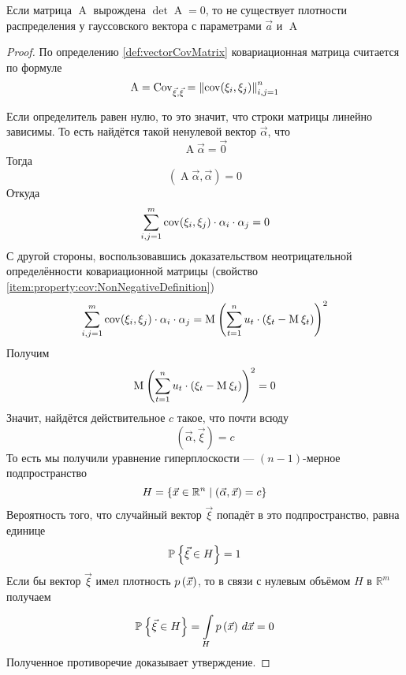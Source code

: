 \begin{affirmation}
  Если матрица $\operatorname{A}$ вырождена $\det\operatorname{A} = 0$, то не
  существует плотности распределения у гауссовского вектора с параметрами
  $\vec{a}$ и $\operatorname{A}$
\end{affirmation}
\begin{proof}
  По определению \ref{def:vectorCovMatrix} ковариационная матрица считается по
  формуле
  $$\operatorname{A}
      = \dCov{\vec{\xi}}
      = \left\| \cov{\xi_i, \xi_j} \right\|_{i,j=1}^n$$

  Если определитель равен нулю, то это значит, что строки матрицы линейно
  зависимы.
  То есть найдётся такой ненулевой вектор $\vec{\alpha}$, что
  \begin{equation*}
    \operatorname{A} \vec{\alpha} = \vec{0}
  \end{equation*}
  Тогда
  \begin{equation*}
    \left( \operatorname{A} \vec{\alpha}, \vec{\alpha} \right) = 0
  \end{equation*}
  Откуда
  \begin{equation*}
    \sum_{i,j=1}^{m} \cov{\xi_i, \xi_j} \cdot \alpha_i \cdot \alpha_j = 0
  \end{equation*}
  С другой стороны, воспользовавшись доказательством  неотрицательной
  определённости ковариационной матрицы
  (свойство \ref{item:property:cov:NonNegativeDefinition})
  \begin{equation*}
    \sum_{i,j=1}^{m} \cov{\xi_i, \xi_j} \cdot \alpha_i \cdot \alpha_j
    = \mean{\left( \sum_{t=1}^{n} u_t
      \cdot \left( \xi_t - \mean{\xi_t} \right) \right)^2}
  \end{equation*}
  Получим
  \begin{equation*}
    \mean{\left( \sum_{t=1}^{n} u_t
      \cdot \left( \xi_t - \mean{\xi_t} \right) \right)^2}
    = 0
  \end{equation*}
  Значит, найдётся действительное $c$ такое, что почти всюду
  \begin{equation*}
    \left( \vec{\alpha}, \vec{\xi} \right) = c
  \end{equation*}
  То есть мы получили уравнение гиперплоскости ---
  $\left( n-1 \right)$-мерное подпространство
  $$H = \left\{ \vec{x} \in \mathbb{R}^n
      \mcond \left( \vec{\alpha}, \vec{x} \right) = c \right\}$$
  Вероятность того, что случайный вектор $\vec{\xi}$ попадёт в это
  подпространство, равна единице
  $$\Probability{\vec{\xi} \in H} = 1$$
  Если бы вектор $\vec{\xi}$ имел плотность $\pdf{\vec{x}}$, то в связи с
  нулевым объёмом $H$ в $\mathbb{R}^m$ получаем
  \begin{equation*}
    \Probability{\vec{\xi} \in H} = \integrall{H}{d\vec{x}}{\pdf{\vec{x}}} = 0
  \end{equation*}
  Полученное противоречие доказывает утверждение.
\end{proof}

